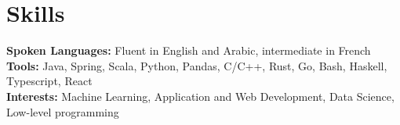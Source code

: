 \documentclass[]{article}
\begin{document}

\section{Skills}
\textbf{Spoken Languages:} Fluent in English and Arabic, intermediate in French\\
\textbf{Tools:} Java, Spring, Scala, Python, Pandas, C/C++, Rust, Go, Bash, Haskell, Typescript, React \\
\textbf{Interests:} Machine Learning, Application and Web Development, Data Science, Low-level programming
\end{document}
